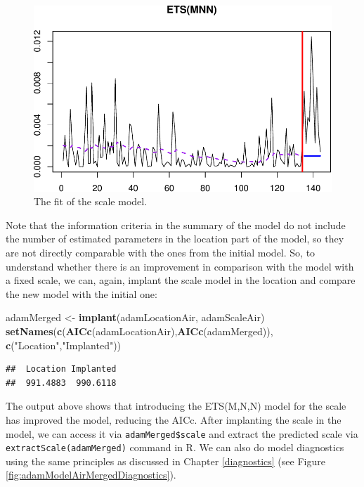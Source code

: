 \documentclass[]{book}
\newenvironment{Shaded}{\begin{snugshade}}{\end{snugshade}}
\newcommand{\KeywordTok}[1]{\textcolor[rgb]{0.13,0.29,0.53}{\textbf{#1}}}
\newcommand{\NormalTok}[1]{#1}
\newcommand{\StringTok}[1]{\textcolor[rgb]{0.31,0.60,0.02}{#1}}
\theoremstyle{definition}
\theoremstyle{definition}
\theoremstyle{definition}
\theoremstyle{definition}
\theoremstyle{remark}
\begin{document}
\begin{figure}
\centering
\includegraphics{Svetunkov--2022----ADAM_files/figure-latex/adamModelAirScaleLinear-1.pdf}
\caption{\label{fig:adamModelAirScaleLinear}The fit of the scale model.}
\end{figure}

Note that the information criteria in the summary of the model do not include the number of estimated parameters in the location part of the model, so they are not directly comparable with the ones from the initial model. So, to understand whether there is an improvement in comparison with the model with a fixed scale, we can, again, implant the scale model in the location and compare the new model with the initial one:

\begin{Shaded}
\begin{Highlighting}[]
\NormalTok{adamMerged <-}\StringTok{ }\KeywordTok{implant}\NormalTok{(adamLocationAir, adamScaleAir)}
\KeywordTok{setNames}\NormalTok{(}\KeywordTok{c}\NormalTok{(}\KeywordTok{AICc}\NormalTok{(adamLocationAir),}\KeywordTok{AICc}\NormalTok{(adamMerged)),}
         \KeywordTok{c}\NormalTok{(}\StringTok{"Location"}\NormalTok{,}\StringTok{"Implanted"}\NormalTok{))}
\end{Highlighting}
\end{Shaded}

\begin{verbatim}
##  Location Implanted 
##  991.4883  990.6118
\end{verbatim}

The output above shows that introducing the ETS(M,N,N) model for the scale has improved the model, reducing the AICc. After implanting the scale in the model, we can access it via \texttt{adamMerged\$scale} and extract the predicted scale via \texttt{extractScale(adamMerged)} command in R. We can also do model diagnostics using the same principles as discussed in Chapter \ref{diagnostics} (see Figure \ref{fig:adamModelAirMergedDiagnostics}).
\end{document}
